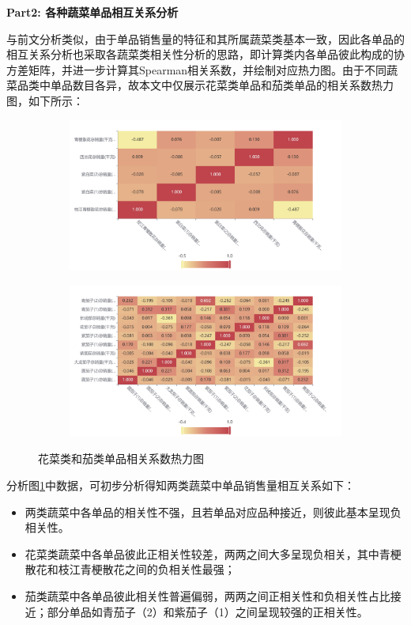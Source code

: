 \documentclass{my_paper}
\begin{document}
\vspace{0.5cm}
\textbf{Part2: 各种蔬菜单品相互关系分析}\par
与前文分析类似，由于单品销售量的特征和其所属蔬菜类基本一致，因此各单品的相互关系分析也采取各蔬菜类相关性分析的思路，即计算类内各单品彼此构成的协方差矩阵，并进一步计算其Spearman相关系数，并绘制对应热力图。由于不同蔬菜品类中单品数目各异，故本文中仅展示花菜类单品和茄类单品的相关系数热力图，如下所示：
\begin{figure}[H]
    \centering
    \begin{subfigure}{0.45\textwidth}
        \includegraphics[width=\linewidth]{spearman花菜类.png}
    \end{subfigure}%
    \hfill
    \begin{subfigure}{0.45\textwidth}
        \includegraphics[width=\linewidth]{spearman茄类.png}
    \end{subfigure}
    \caption{花菜类和茄类单品相关系数热力图}
    \label{花菜类和茄类单品相关系数热力图}
\end{figure}
分析图\ref{花菜类和茄类单品相关系数热力图}中数据，可初步分析得知两类蔬菜中单品销售量相互关系如下：
        \begin{itemize}[label=$\star$]
            \item 两类蔬菜中各单品的相关性不强，且若单品对应品种接近，则彼此基本呈现负相关性。
            \item 花菜类蔬菜中各单品彼此正相关性较差，两两之间大多呈现负相关，其中青梗散花和枝江青梗散花之间的负相关性最强；
            \item 茄类蔬菜中各单品彼此相关性普遍偏弱，两两之间正相关性和负相关性占比接近；部分单品如青茄子（2）和紫茄子（1）之间呈现较强的正相关性。
        \end{itemize}
        
\end{document}
